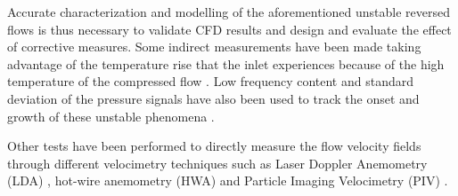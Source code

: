 



Accurate characterization and modelling of the aforementioned unstable reversed flows is thus necessary to validate CFD results and design and evaluate the effect of corrective measures. Some indirect measurements have been made taking advantage of the temperature rise that the inlet experiences because of the high temperature of the compressed flow \cite{andersen2009surge,figurella2012noise}. Low frequency content and standard deviation of the pressure signals have also been used to track the onset and growth of these unstable phenomena \cite{liu2013methods}.

Other tests have been performed to directly measure the flow velocity fields through different velocimetry techniques such as Laser Doppler Anemometry (LDA) \cite{pedersen2003flow}, hot-wire anemometry (HWA) \cite{oro2009forced,kalpakli2015combined} and Particle Imaging Velocimetry (PIV) \cite{wernet2000development,liu2006application,pedersen2003flow}.


